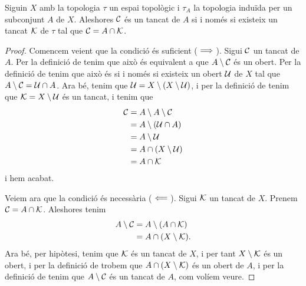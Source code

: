 \documentclass[../Apunts.tex]{subfiles}
\begin{document}
	\begin{proposition}
		\label{prop:C és un tancat si i només si existeix un tancat K tal que l'intersecció de A i K és C}
		Siguin \(X\) amb la topologia \(\tau\) un espai topològic i \(\tau_{A}\) la topologia induïda per un subconjunt \(A\) de \(X\). Aleshores \(\mathcal{C}\) és un tancat de \(A\) si i només si existeix un tancat \(\mathcal{K}\) de \(\tau\) tal que \(\mathcal{C}=A\cap\mathcal{K}\).
		\begin{proof}
			Comencem veient que la condició és suficient (\(\implies\)). Sigui \(\mathcal{C}\) un tancat de \(A\). Per la definició de  tenim que això és equivalent a que \(A\setminus\mathcal{C}\) és un obert. Per la definició de  tenim que això és si i només si existeix un obert \(\mathcal{U}\) de \(X\) tal que \(A\setminus\mathcal{C}=\mathcal{U}\cap A\). Ara bé, tenim que \(\mathcal{U}=X\setminus(X\setminus\mathcal{U})\), i per la definició de  tenim que \(\mathcal{K}=X\setminus\mathcal{U}\) és un tancat, i tenim que
			\begin{align*}
				\mathcal{C}&=A\setminus A\setminus\mathcal{C} \\
				&=A\setminus(\mathcal{U}\cap A) \\
				&=A\setminus\mathcal{U} \\
				&=A\cap(X\setminus\mathcal{U}) \\
				&=A\cap\mathcal{K}
			\end{align*}
			i hem acabat.
			
			Veiem ara que la condició és necessària (\(\impliedby\)). Sigui \(\mathcal{K}\) un tancat de \(X\). Prenem \(\mathcal{C}=A\cap\mathcal{K}\). Aleshores tenim
			\begin{align*}
				A\setminus\mathcal{C}&=A\setminus(A\cap\mathcal{K}) \\
				&=A\cap(X\setminus\mathcal{K}).
			\end{align*}
			Ara bé, per hipòtesi, tenim que \(\mathcal{K}\) és un tancat de \(X\), i per tant \(X\setminus\mathcal{K}\) és un obert, i per la definició de  trobem que \(A\cap(X\setminus\mathcal{K})\) és un obert de \(A\), i per la definició de  tenim que \(A\setminus\mathcal{C}\) és un tancat de \(A\), com volíem veure.
		\end{proof}
	\end{proposition}
\end{document}
